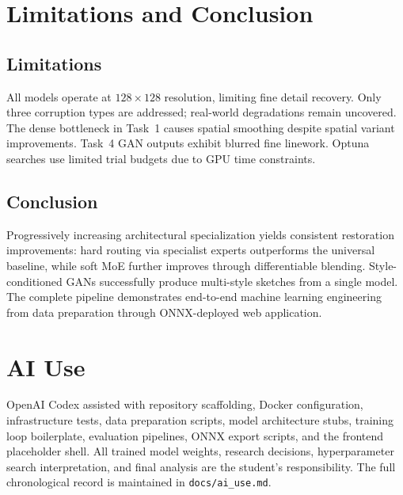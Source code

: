 \documentclass[conference]{IEEEtran}
\begin{document}
\section{Limitations and Conclusion}

\subsection{Limitations}
All models operate at $128 \times 128$ resolution, limiting fine detail recovery. Only three corruption types are addressed; real-world degradations remain uncovered. The dense bottleneck in Task~1 causes spatial smoothing despite spatial variant improvements. Task~4 GAN outputs exhibit blurred fine linework. Optuna searches use limited trial budgets due to GPU time constraints.

\subsection{Conclusion}
Progressively increasing architectural specialization yields consistent restoration improvements: hard routing via specialist experts outperforms the universal baseline, while soft MoE further improves through differentiable blending. Style-conditioned GANs successfully produce multi-style sketches from a single model. The complete pipeline demonstrates end-to-end machine learning engineering from data preparation through ONNX-deployed web application.

\appendices
\section{AI Use}
OpenAI Codex assisted with repository scaffolding, Docker configuration, infrastructure tests, data preparation scripts, model architecture stubs, training loop boilerplate, evaluation pipelines, ONNX export scripts, and the frontend placeholder shell. All trained model weights, research decisions, hyperparameter search interpretation, and final analysis are the student's responsibility. The full chronological record is maintained in \texttt{docs/ai\_use.md}.



\end{document}
